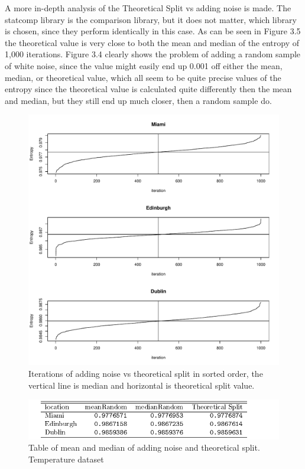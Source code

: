 A more in-depth analysis of the Theoretical Split vs adding noise is made. The statcomp library is the comparison library, but it does not matter, which library is chosen, since they perform identically in this case. As can be seen in Figure 3.5 the theoretical value is very close to both the mean and median of the entropy of 1,000 iterations. Figure 3.4 clearly shows the problem of adding a random sample of white noise, since the value might easily end up 0.001 off either the mean, median, or theoretical value, which all seem to be quite precise values of the entropy since the theoretical value is calculated quite differently then the mean and median, but they still end up much closer, then a random sample do. 

\begin{figure}
    \centering
    \includegraphics[width=\textwidth,keepaspectratio]{../../Weather/noiseStochasticTheoretical.pdf}
    \caption{Iterations of adding noise vs theoretical split in sorted order, the vertical line is median and horizontal is theoretical split value.}
\end{figure}

\begin{figure}
    \centering
    \includegraphics[width=\textwidth,keepaspectratio]{../../Weather/random_vs_theoreticalSplit.pdf}
    \caption{Table of mean and median of adding noise and theoretical split. Temperature dataset}
\end{figure}

